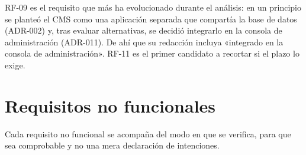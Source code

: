 RF-09 es el requisito que más ha evolucionado durante el análisis: en un
principio se planteó el CMS como una aplicación separada que compartía la
base de datos (ADR-002) y, tras evaluar alternativas, se decidió integrarlo
en la consola de administración (ADR-011). De ahí que su redacción incluya
«integrado en la consola de administración». RF-11 es el primer candidato a
recortar si el plazo lo exige.

\section{Requisitos no funcionales}
\label{sec:rnf}

Cada requisito no funcional se acompaña del modo en que se verifica, para que
sea comprobable y no una mera declaración de intenciones.

